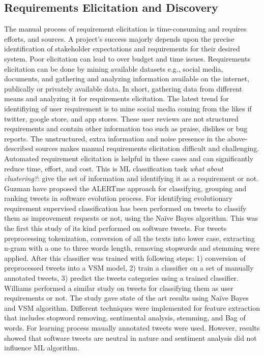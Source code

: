 
\subsection{Requirements Elicitation and Discovery}

The manual process of requirement elicitation is time-consuming and requires
efforts, and sources. A project's success majorly depends
upon the precise identification of stakeholder expectations and requirements for their desired
system. Poor elicitation can lead to over budget and time issues.
 Requirements elicitation can be done by mining
available datasets e.g., social media, documents, and gathering and analyzing information available on the internet,
publically or privately available data. In short, gathering data from different
means and analyzing it for requirements elicitation.  The latest trend for
identifiying of user requirement is to mine social media coming from the likes
if twitter, google store, and app stores. These user reviews are not
structured requirements and contain other information too such as praise,
dislikes or bug reports. The unstructured, extra information and noise
presence in the above-described sources makes manual requirements
elicitation difficult and challenging. Automated requirement elicitation
is helpful in these cases and can significantly reduce time, effort, and cost.
This is ML classification task \emph{what about clustering?}: give the set of
information and identifying it as a requirement or not.
\\

Guzman \etal \cite{Guzman:2017} have proposed the ALERTme approach for
classifying, grouping and ranking tweets in software evolution
process. For identifying evolutionary requirement supervised classification
has been performed on tweets to classify them as improvement requests or not,
using the Naïve Bayes algorithm. This was the first this study of its kind
performed on software tweets. For tweets preprocessing tokenization, conversion of all the texts into lower case, extracting n-gram with a one to three words length, removing stopwords and stemming were applied. 
After this classifier was trained with following steps: 1) conversion of preprocessed tweets into a VSM model, 2) train a classifier on a set of manually annotated tweets, 3) predict the tweets categories using a trained classifier.\\

Williams \etal \cite{Williams:2017} performed a similar study on tweets for
classifying them as user requirements or not. The study gave state of the art
results using Naïve Bayes and VSM
algorithm.
Different techniques were implemented for feature extraction that includes stopword removing, sentimental analysis,
stemming, and Bag of words.
For learning process maually annotated tweets were used. However, results showed
that software tweets are neutral in nature and sentiment analysis did not
influence ML algorithm.\\

